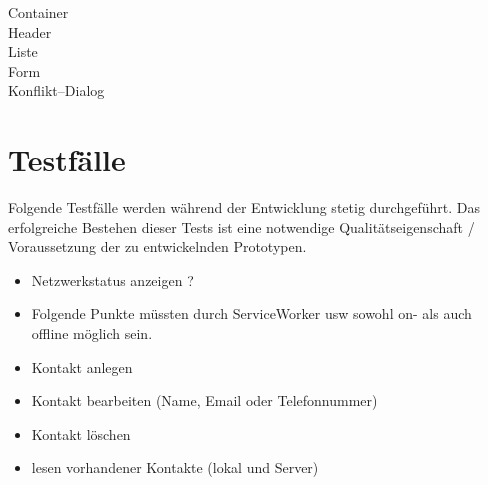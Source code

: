 Container\\
Header\\
Liste\\
Form\\
Konflikt--Dialog\\
%
%
\section{Testfälle}
Folgende Testfälle werden während der Entwicklung stetig durchgeführt. Das erfolgreiche Bestehen dieser Tests ist eine notwendige Qualitätseigenschaft / Voraussetzung der zu entwickelnden Prototypen.
\begin{itemize}
  	\item Netzwerkstatus anzeigen ? 
    \item Folgende Punkte müssten durch ServiceWorker usw sowohl on- als auch offline möglich sein. 
    \item Kontakt anlegen 
    \item Kontakt bearbeiten (Name, Email oder Telefonnummer)
    \item Kontakt löschen 
    \item lesen vorhandener Kontakte (lokal und Server)
\end{itemize}
%
%
